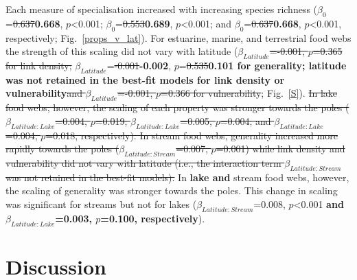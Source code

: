 \documentclass[12pt]{article}
\begin{document}
  Each measure of specialisation increased with increasing
  species richness ($\beta_0$=\st{0.637}\textbf{0.668}, $p$\textless0.001; $\beta_0$=\st{0.553}\textbf{0.689},
  $p$\textless0.001; and $\beta_0$=\st{0.637}\textbf{0.668}, $p$\textless0.001, respectively;
  Fig.~\ref{props_v_lat}). 
  For estuarine, marine, and terrestrial food webs the
  strength of this scaling did not vary with latitude
  (\st{$\beta_{Latitude}$=-0.001, $p$=0.365 for link density;}
  $\beta_{Latitude}$=\st{-0.001}\textbf{-0.002}, $p$=\st{0.535}\textbf{0.101 for generality; 
  latitude was not retained in the best-fit models for link density or vulnerability}\st{and
  $\beta_{Latitude}$=-0.001, $p$=0.366 for vulnerability}; Fig.~\ref{S}). 
  \st{In lake food webs, however, the scaling of each property was stronger towards
  the poles ($\beta_{Latitude:Lake}$=0.004, $p$=0.019;
  $\beta_{Latitude:Lake}$=0.005, $p$=0.004; and
  $\beta_{Latitude:Lake}$=0.004, $p$=0.018, respectively). In stream food
  webs, generality increased more rapidly towards the poles
  ($\beta_{Latitude:Stream}$=0.007, $p$=0.001) while link density and
  vulnerability did not vary with latitude (i.e., the interaction term 
  $\beta_{Latitude:Stream}$ was not retained in the best-fit models).}
  In \textbf{lake and} stream food webs, however, the scaling of generality was stronger
  towards the poles. This change in scaling was significant for streams but not for
  lakes ($\beta_{Latitude:Stream}$=0.008, $p$\textless0.001\textbf{ and $\beta_{Latitude:Lake}$=0.003, $p$=0.100, respectively}).



\section*{Discussion}
\end{document}
